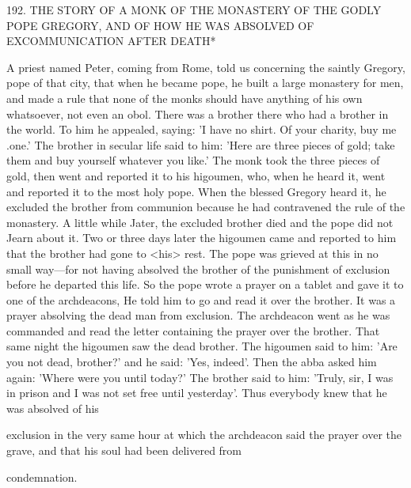192. THE STORY OF A MONK
OF THE MONASTERY OF THE
GODLY POPE GREGORY,
AND OF HOW HE WAS ABSOLVED
OF EXCOMMUNICATION AFTER DEATH*

A priest named Peter, coming from Rome, told us concerning the
saintly Gregory, pope of that city, that when he became pope, he
built a large monastery for men, and made a rule that none of the
monks should have anything of his own whatsoever, not even an
obol. There was a brother there who had a brother in the world. To
him he appealed, saying: 'I have no shirt. Of your charity, buy me
.one.' The brother in secular life said to him: 'Here are three pieces
of gold; take them and buy yourself whatever you like.' The monk
took the three pieces of gold, then went and reported it to his
higoumen, who, when he heard it, went and reported it to the most
holy pope. When the blessed Gregory heard it, he excluded the
brother from communion because he had contravened the rule of
the monastery. A little while Jater, the excluded brother died and the
pope did not Jearn about it. Two or three days later the higoumen
came and reported to him that the brother had gone to <his> rest.
The pope was grieved at this in no small way—for not having
absolved the brother of the punishment of exclusion before he
departed this life. So the pope wrote a prayer on a tablet and gave
it to one of the archdeacons, He told him to go and read it over the
brother. It was a prayer absolving the dead man from exclusion.
The archdeacon went as he was commanded and read the letter
containing the prayer over the brother. That same night the
higoumen saw the dead brother. The higoumen said to him: 'Are
you not dead, brother?' and he said: 'Yes, indeed'. Then the abba
asked him again: 'Where were you until today?' The brother said to
him: 'Truly, sir, I was in prison and I was not set free until
yesterday'. Thus everybody knew that he was absolved of his

exclusion in the very same hour at which the archdeacon said the
prayer over the grave, and that his soul had been delivered from

condemnation.

